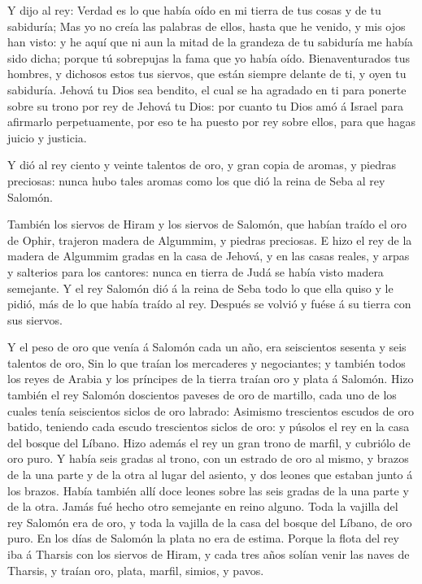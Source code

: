  Y dijo al rey: Verdad es lo que había oído en mi tierra de
tus cosas y de tu sabiduría;  Mas yo no creía las palabras
de ellos, hasta que he venido, y mis ojos han visto: y he aquí que ni
aun la mitad de la grandeza de tu sabiduría me había sido dicha; porque
tú sobrepujas la fama que yo había oído.  Bienaventurados
tus hombres, y dichosos estos tus siervos, que están siempre delante de
ti, y oyen tu sabiduría.  Jehová tu Dios sea bendito, el
cual se ha agradado en ti para ponerte sobre su trono por rey de Jehová
tu Dios: por cuanto tu Dios amó á Israel para afirmarlo perpetuamente,
por eso te ha puesto por rey sobre ellos, para que hagas juicio y
justicia.

 Y dió al rey ciento y veinte talentos de oro, y gran copia
de aromas, y piedras preciosas: nunca hubo tales aromas como los que dió
la reina de Seba al rey Salomón.

 También los siervos de Hiram y los siervos de Salomón, que
habían traído el oro de Ophir, trajeron madera de Algummim, y piedras
preciosas.  E hizo el rey de la madera de Algummim gradas
en la casa de Jehová, y en las casas reales, y arpas y salterios para
los cantores: nunca en tierra de Judá se había visto madera semejante.
 Y el rey Salomón dió á la reina de Seba todo lo que ella
quiso y le pidió, más de lo que había traído al rey. Después se volvió y
fuése á su tierra con sus siervos.

 Y el peso de oro que venía á Salomón cada un año, era
seiscientos sesenta y seis talentos de oro,  Sin lo que
traían los mercaderes y negociantes; y también todos los reyes de Arabia
y los príncipes de la tierra traían oro y plata á Salomón. 
Hizo también el rey Salomón doscientos paveses de oro de martillo, cada
uno de los cuales tenía seiscientos siclos de oro labrado: 
Asimismo trescientos escudos de oro batido, teniendo cada escudo
trescientos siclos de oro: y púsolos el rey en la casa del bosque del
Líbano.  Hizo además el rey un gran trono de marfil, y
cubriólo de oro puro.  Y había seis gradas al trono, con un
estrado de oro al mismo, y brazos de la una parte y de la otra al lugar
del asiento, y dos leones que estaban junto á los brazos. 
Había también allí doce leones sobre las seis gradas de la una parte y
de la otra. Jamás fué hecho otro semejante en reino alguno.
 Toda la vajilla del rey Salomón era de oro, y toda la
vajilla de la casa del bosque del Líbano, de oro puro. En los días de
Salomón la plata no era de estima.  Porque la flota del rey
iba á Tharsis con los siervos de Hiram, y cada tres años solían venir
las naves de Tharsis, y traían oro, plata, marfil, simios, y pavos.

